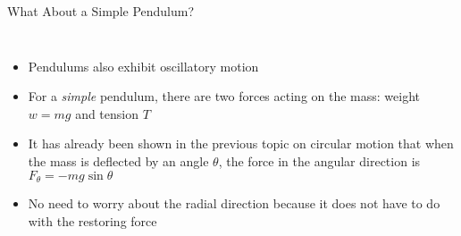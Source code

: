 \documentclass[12pt,compress,aspectratio=169]{beamer}
\newcommand{\mb}[1]{\ensuremath\mathbf{#1}}
\begin{document}
\begin{frame}{What About a Simple Pendulum?}
  \begin{columns}
    \begin{itemize}
    \item Pendulums also exhibit oscillatory motion
    \item For a \emph{simple} pendulum, there are two forces acting on the
      mass: weight $w=mg$ and tension $T$
    \item It has already been shown in the previous topic on circular motion
      that when the mass is deflected by an angle $\theta$, the force in the
      angular direction is $F_\theta=-mg\sin\theta$
    \item No need to worry about the radial direction because it does not
      have to do with the restoring force
    \end{itemize}

  \end{columns}
\end{frame}
\end{document}
